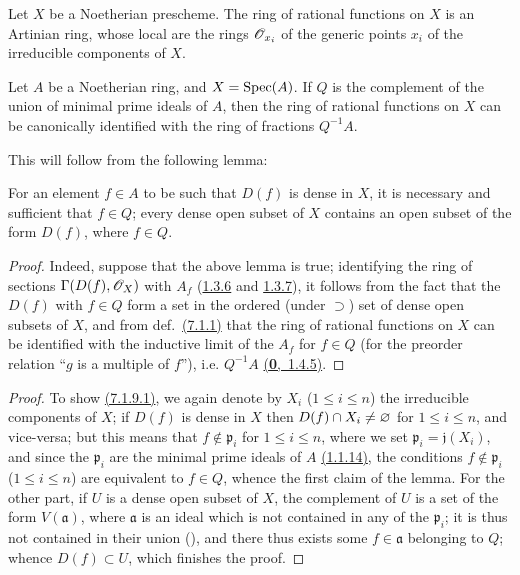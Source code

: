 \begin{cor}[7.1.8]
\label{1.7.1.8}
Let $X$ be a Noetherian prescheme.
The ring of rational functions on $X$ is an Artinian ring, whose local  are the rings $\mathscr{O}_{x_i}$ of the generic points $x_i$ of the irreducible components of $X$.
\end{cor}

\begin{cor}[7.1.9]
\label{1.7.1.9}
Let $A$ be a Noetherian ring, and $X={\mathop{\mathrm{Spec}}\nolimits}(A)$.
If $Q$ is the complement of the union of minimal prime ideals of $A$, then the ring of rational functions on $X$ can be canonically identified with the ring of fractions $Q^{-1}A$.
\end{cor}

This will follow from the following lemma:

\begin{lem}[7.1.9.1]
\label{1.7.1.9.1}
For an element $f\in A$ to be such that $D(f)$ is dense in $X$, it is necessary and sufficient that $f\in Q$; every dense open subset of $X$ contains an open subset of the form $D(f)$, where $f\in Q$.
\end{lem}

\begin{proof}
\label{proof-1.7.1.9}
Indeed, suppose that the above lemma is true; identifying the ring of sections $\Gamma(D(f),\mathscr{O}_X)$ with $A_f$ (\hyperref[1.1.3.6]{1.3.6} and \hyperref[1.1.3.7]{1.3.7}), it follows from the fact that the $D(f)$ with $f\in Q$ form a  set in the ordered (under $\supset$) set of dense open subsets of $X$, and from def.~\hyperref[1.7.1.1]{(7.1.1)} that the ring of rational functions on $X$ can be identified with the inductive limit of the $A_f$ for $f\in Q$ (for the preorder relation ``$g$ is a multiple of $f$''), i.e. $Q^{-1}A$ \hyperref[0.1.4.5]{(\textbf{0},~1.4.5)}.
\end{proof}

\begin{proof}
\label{proof-1.7.1.9.1}
To show \hyperref[1.7.1.9.1]{(7.1.9.1)}, we again denote by $X_i$ ($1\leqslant i\leqslant n$) the irreducible components of $X$; if $D(f)$ is dense in $X$ then $D(f)\cap X_i\neq\varnothing$ for $1\leqslant i\leqslant n$, and vice-versa; but this means that $f\not\in\mathfrak{p}_i$ for $1\leqslant i\leqslant n$, where we set $\mathfrak{p}_i=\mathfrak{j}(X_i)$, and since the $\mathfrak{p}_i$ are the minimal prime ideals of $A$ \hyperref[1.1.1.14]{(1.1.14)}, the conditions $f\not\in\mathfrak{p}_i$ ($1\leqslant i\leqslant n$) are equivalent to $f\in Q$, whence the first claim of the lemma.
For the other part, if $U$ is a dense open subset of $X$, the complement of $U$ is a set of the form $V(\mathfrak{a})$, where $\mathfrak{a}$ is an ideal which is not contained in any of the $\mathfrak{p}_i$; it is thus not contained in their union (\cite[p.~13]{I-10}), and there thus exists some $f\in\mathfrak{a}$ belonging to $Q$; whence $D(f)\subset U$, which finishes the proof.
\end{proof}

